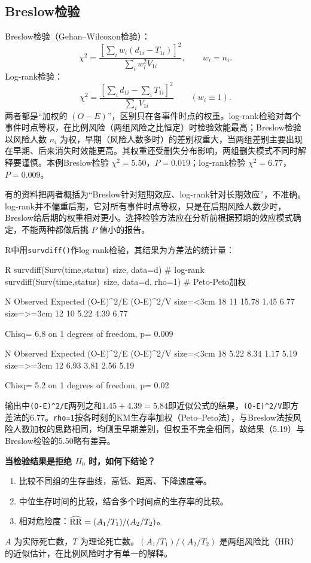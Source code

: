 \subsection{Breslow检验}
Breslow检验（Gehan--Wilcoxon检验）：
\[
\chi^2=\frac{[\sum_i w_i(d_{1i}-T_{1i})]^2}{\sum_i w_i^2V_{1i}},\qquad w_i=n_i.
\]
Log-rank检验：
\[
\chi^2=\frac{[\sum_i d_{1i}-\sum_i T_{1i}]^2}{\sum_i V_{1i}}\qquad(w_i\equiv1).
\]
两者都是“加权的 $(O-E)$”，区别只在各事件时点的权重。log-rank检验对每个事件时点等权，在比例风险（两组风险之比恒定）时检验效能最高；Breslow检验以风险人数 $n_i$ 为权，早期（风险人数多时）的差别权重大，当两组差别主要出现在早期、后来消失时效能更高。其权重还受删失分布影响，两组删失模式不同时解释要谨慎。本例Breslow检验 $\chi^2=5.50$，$P=0.019$；log-rank检验 $\chi^2=6.77$，$P=0.009$。
\begin{annotation}有的资料把两者概括为“Breslow针对短期效应、log-rank针对长期效应”，不准确。log-rank并不偏重后期，它对所有事件时点等权，只是在后期风险人数少时，Breslow给后期的权重相对更小。选择检验方法应在分析前根据预期的效应模式确定，不能两种都做后挑 $P$ 值小的报告。\end{annotation}
R中用\texttt{survdiff()}作log-rank检验，其结果为方差法的统计量：
\par\noindent
\begin{coursecode}{R}
survdiff(Surv(time,status)~size, data=d)          # log-rank
survdiff(Surv(time,status)~size, data=d, rho=1)   # Peto-Peto加权
\end{coursecode}
\begin{routput}
            N Observed Expected (O-E)^2/E (O-E)^2/V
size=<3cm  18       11    15.78      1.45      6.77
size=>=3cm 12       10     5.22      4.39      6.77

 Chisq= 6.8  on 1 degrees of freedom, p= 0.009 

            N Observed Expected (O-E)^2/E (O-E)^2/V
size=<3cm  18     5.22     8.34      1.17      5.19
size=>=3cm 12     6.93     3.81      2.56      5.19

 Chisq= 5.2  on 1 degrees of freedom, p= 0.02 
\end{routput}
输出中\texttt{(O-E)\^{}2/E}两列之和$1.45+4.39=5.84$即近似公式的结果，\texttt{(O-E)\^{}2/V}即方差法的6.77。\texttt{rho=1}按各时刻的KM生存率加权（Peto--Peto法），与Breslow法按风险人数加权的思路相同，均侧重早期差别，但权重不完全相同，故结果（5.19）与Breslow检验的5.50略有差异。

\textbf{当检验结果是拒绝 $H_0$ 时，如何下结论？}
\begin{enumerate}
\item 比较不同组的生存曲线，高低、距离、下降速度等。
\item 中位生存时间的比较，结合多个时间点的生存率的比较。
\item 相对危险度：$\widehat{\operatorname{RR}}=(A_1/T_1)/(A_2/T_2)$。
\end{enumerate}
\begin{annotation}$A$ 为实际死亡数，$T$ 为理论死亡数。$(A_1/T_1)/(A_2/T_2)$ 是两组风险比（HR）的近似估计，在比例风险时才有单一的解释。\end{annotation}
